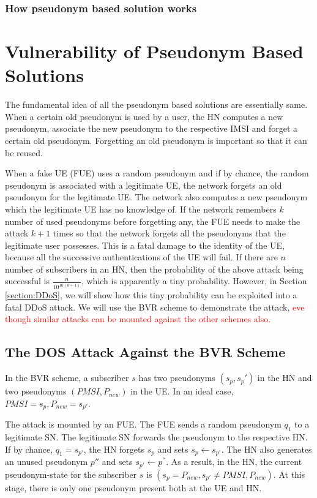 \documentclass{llncs} %
\begin{document}
\subsubsection{How pseudonym based solution works}


\section{Vulnerability of Pseudonym Based Solutions}
The fundamental idea of all the pseudonym based solutions \cite{CCS15,SSR15,Ginzboorg_Niemi_2016,Norrman_Naslund_Dubrova_2016} are essentially same. When a certain old pseudonym is  used by a user, the HN computes a new pseudonym, associate the new pseudonym to the respective IMSI and forget a certain old pseudonym. Forgetting an old pseudonym is important so that it can be reused. 

When a fake UE (FUE) uses a random pseudonym and if by chance, the random pseudonym is associated with a legitimate UE, the network forgets an old pseudonym for the legitimate UE. The network also computes a new pseudonym which the legitimate UE has no knowledge of. If the network remembers  $k$ number of used pseudonyms before forgetting any, the FUE needs to make the attack $k+1$ times so that the network forgets all the pseudonyms that the legitimate user possesses. This is a fatal damage to the identity of the UE, because all the successive authentications of the UE will fail. If there are $n$ number of subscribers in an HN, then the probability of the above attack being successful is $\frac{n}{10^{10(k+1)}}$, which is apparently a tiny probability. However, in Section \ref{section:DDoS}, we will show how this tiny probability can be exploited into a fatal DDoS attack. We will use the BVR scheme to demonstrate the attack, \textcolor{red}{eve though similar attacks can be mounted against the other schemes also.}


\subsection{The DOS Attack Against the BVR Scheme}
In the BVR scheme, a subscriber $s$ has two pseudonyms $\left(s_p,s_p'\right)$ in the HN and two pseudonyms $\left(PMSI,P_{new}\right)$ in the UE. In an ideal case, $PMSI = s_p, P_{new} = s_{p'}$. 

The attack is mounted by an FUE. The FUE sends a random pseudonym $q_1$ to a legitimate SN. The legitimate SN forwards the pseudonym to the respective HN. If by chance, $q_1 = s_{p'}$, the HN forgets $s_p$ and sets $s_p \leftarrow s_{p'}$. The HN also generates an unused pseudonym ${p''}$ and sets $s_{p'} \leftarrow p^{''}$. As a result, in the HN, the current  pseudonym-state for the subscriber $s$ is $\left(s_{p} = P_{new},s_{p'} \neq PMSI,P_{new}\right)$. At this stage, there is only one pseudonym present both at the UE and HN.
\end{document}
